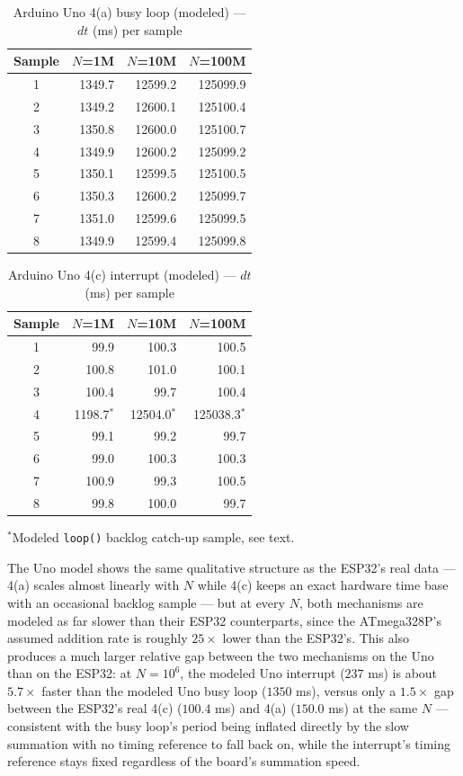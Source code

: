 \begin{table}[!t]
\centering
\caption{Arduino Uno 4(a) busy loop (modeled) — $dt$ (ms) per sample}
\label{tab:uno-a}
\small
\begin{tabular}{@{}c r r r@{}}
\toprule
Sample & $N$=1M & $N$=10M & $N$=100M \\
\midrule
1 & 1349.7 & 12599.2 & 125099.9 \\
2 & 1349.2 & 12600.1 & 125100.4 \\
3 & 1350.8 & 12600.0 & 125100.7 \\
4 & 1349.9 & 12600.2 & 125099.2 \\
5 & 1350.1 & 12599.5 & 125100.5 \\
6 & 1350.3 & 12600.2 & 125099.7 \\
7 & 1351.0 & 12599.6 & 125099.5 \\
8 & 1349.9 & 12599.4 & 125099.8 \\
\bottomrule
\end{tabular}
\end{table}

\begin{table}[!t]
\centering
\caption{Arduino Uno 4(c) interrupt (modeled) — $dt$ (ms) per sample}
\label{tab:uno-c}
\small
\begin{tabular}{@{}c r r r@{}}
\toprule
Sample & $N$=1M & $N$=10M & $N$=100M \\
\midrule
1 & 99.9 & 100.3 & 100.5 \\
2 & 100.8 & 101.0 & 100.1 \\
3 & 100.4 & 99.7 & 100.4 \\
4 & 1198.7$^{*}$ & 12504.0$^{*}$ & 125038.3$^{*}$ \\
5 & 99.1 & 99.2 & 99.7 \\
6 & 99.0 & 100.3 & 100.3 \\
7 & 100.9 & 99.3 & 100.5 \\
8 & 99.8 & 100.0 & 99.7 \\
\bottomrule
\end{tabular}

\vspace{2pt}
{\footnotesize $^{*}$Modeled \texttt{loop()} backlog catch-up sample, see text.}
\end{table}

The Uno model shows the same qualitative structure as the ESP32's real data — 4(a) scales almost linearly with $N$ while 4(c) keeps an exact hardware time base with an occasional backlog sample — but at every $N$, both mechanisms are modeled as far slower than their ESP32 counterparts, since the ATmega328P's assumed addition rate is roughly $25\times$ lower than the ESP32's. This also produces a much larger relative gap between the two mechanisms on the Uno than on the ESP32: at $N=10^6$, the modeled Uno interrupt ($237$ ms) is about $5.7\times$ faster than the modeled Uno busy loop ($1350$ ms), versus only a $1.5\times$ gap between the ESP32's real 4(c) ($100.4$ ms) and 4(a) ($150.0$ ms) at the same $N$ — consistent with the busy loop's period being inflated directly by the slow summation with no timing reference to fall back on, while the interrupt's timing reference stays fixed regardless of the board's summation speed.
